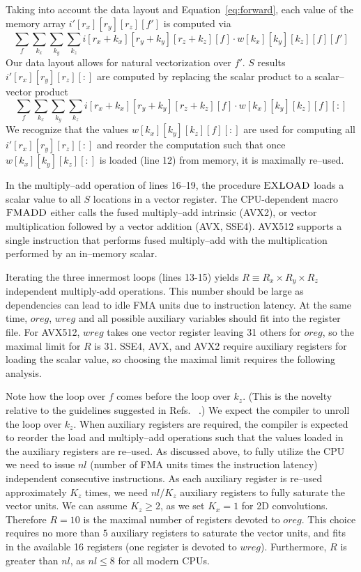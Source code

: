   Taking into account the data layout and Equation~\ref{eq:forward},
  each value of the memory array $i'[r_x][r_y][r_z][f']$ is computed
  via
  {\footnotesize
  \[
    \sum_{f} \sum_{k_x} \sum_{k_y} \sum_{k_z}
    i[r_x+k_x][r_y+k_y][r_z+k_z][f] \cdot w[k_x][k_y][k_z][f][f']
    \]
    }
  Our data layout allows for natural vectorization over $f'$.  $S$
  results $i'[r_x][r_y][r_z][:]$ are computed by replacing the scalar
  product to a scalar--vector product
{\footnotesize
  \[
  \sum_{f} \sum_{k_x} \sum_{k_y} \sum_{k_z}
  i[r_x+k_x][r_y+k_y][r_z+k_z][f] \cdot w[k_x][k_y][k_z][f][:]
  \]
}
  We recognize that the values $w[k_x][k_y][k_z][f][:]$ are used for
  computing all $i'[r_x][r_y][r_z][:]$ and reorder the computation
  such that once $w[k_x][k_y][k_z][:]$ is loaded (line 12) from
  memory, it is maximally re--used.
  
  In the multiply--add operation of lines 16--19, the procedure
  $\textnormal{\scshape EXLOAD}$ loads a scalar value to all $S$ locations in a
  vector register.  The CPU-dependent macro $\textnormal{\scshape FMADD}$ either
  calls the fused multiply--add intrinsic (AVX2), or vector
  multiplication followed by a vector addition (AVX, SSE4).  AVX512
  supports a single instruction that performs fused multiply--add with
  the multiplication performed by an in--memory scalar.

  Iterating the three innermost loops (lines 13-15) yields $R\equiv R_x \times
  R_y \times R_z$ independent multiply-add operations.  This number
  should be large as dependencies can lead to idle FMA units due to
  instruction latency. At the same time, $oreg$, $wreg$ and all
  possible auxiliary variables should fit into the register file.  For
  AVX512, $wreg$ takes one vector register leaving 31 others for
  $oreg$, so the maximal limit for $R$ is 31.
  SSE4, AVX, and AVX2 require auxiliary registers for loading the
  scalar value, so choosing the maximal limit requires the following
  analysis.

  Note how the loop over $f$ comes before the loop over $k_z$.  (This
  is the novelty relative to the guidelines suggested in
  Refs. ~\cite{chellapilla2006high,das2016distributed}.) We expect the
  compiler to unroll the loop over $k_z$.  When auxiliary registers
  are required, the compiler is expected to reorder the load and
  multiply--add operations such that the values loaded in the
  auxiliary registers are re--used.  As discussed above, to fully
  utilize the CPU we need to issue $nl$ (number of FMA units times the
  instruction latency) independent consecutive instructions.  As each
  auxiliary register is re--used approximately $K_z$ times, we need
  $nl/K_z$ auxiliary registers to fully saturate the vector units.  We
  can assume $K_z \ge 2$, as we set $K_x=1$ for 2D convolutions.
  Therefore $R = 10$ is the maximal number of registers devoted to
  $oreg$. This choice requires no more than $5$ auxiliary registers to
  saturate the vector units, and fits in the available 16 registers
  (one register is devoted to $wreg$). Furthermore, $R$ is greater
  than $nl$, as $nl \le 8$ for all modern CPUs.


